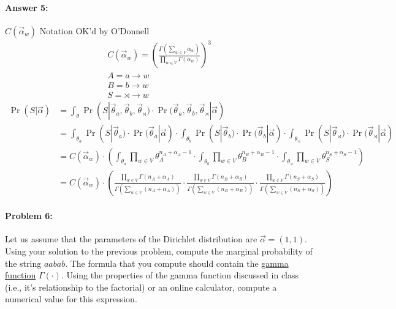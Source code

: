 \documentclass[12pt, letterpaper]{article}
\begin{document}
\paragraph{Answer 5:} $C(\vec{\alpha}_{w})$ Notation OK'd by O'Donnell
\begin{gather*}
    C(\vec{\alpha}_{w}) = \left(\frac{\Gamma(\sum_{w \in V} \alpha_{w})}{\prod_{w \in V} \Gamma(\alpha_{w})}\right)^3\\
    A = a\rightarrow w\\
    B = b \rightarrow w\\
    S = \rtimes \rightarrow w
\end{gather*}
\begin{align*}
    \Pr(S|\vec{\alpha}) &= \int_{\theta} \Pr(S | \vec{\theta}_{a}, \vec{\theta}_{b}, \vec{\theta}_{\rtimes})\cdot{\Pr(\vec{\theta}_{a}}, \vec{\theta}_{b}, \vec{\theta}_{\rtimes}|\vec{\alpha})\\
    &= \int_{\theta_{a}} \Pr(S | \vec{\theta}_{a})\cdot{\Pr(\vec{\theta}_{a}}|\vec{\alpha})\cdot{
    \int_{\theta_{b}} \Pr(S | \vec{\theta}_{b})\cdot{\Pr(\vec{\theta}_{b}}|\vec{\alpha})\cdot{
    \int_{\theta_{\rtimes}} \Pr(S | \vec{\theta}_{\rtimes})\cdot{\Pr(\vec{\theta}_{\rtimes}}|\vec{\alpha})}}\\
    &= C(\vec{\alpha}_{w})\cdot{\left(
    \int_{\theta_{a}}\prod_{w \in V} \theta_{A}^{n_A+\alpha_{A}-1}\cdot{
    \int_{\theta_{b}}\prod_{w \in V} \theta_{B}^{n_B+\alpha_{B}-1}\cdot{
    \int_{\theta_{\rtimes}}\prod_{w \in V} \theta_{S}^{n_S+\alpha_{S}-1}}}\right)}\\
    &= C(\vec{\alpha}_{w})\cdot{\left(
    \frac{\prod_{w \in V} \Gamma(n_A+\alpha_{A})}{\Gamma(\sum_{w\in V} (n_A+\alpha_{A}))}\cdot{
    \frac{\prod_{w \in V} \Gamma(n_B+\alpha_{B})}{\Gamma(\sum_{w \in V} (n_B+\alpha_{B}))}\cdot{
    \frac{\prod_{w \in V} \Gamma(n_S+\alpha_{S})}{\Gamma(\sum_{w \in V} (n_S+\alpha_{S}))}}}\right)}
\end{align*}

\hrulefill
\paragraph{Problem 6:}

Let us assume that the parameters of the Dirichlet distribution are
$\vec{\alpha} = (1,1)$. Using your solution to the previous problem,
compute the marginal probability of the string $aabab$. The formula
that you compute should contain the
\href{https://en.wikipedia.org/wiki/Gamma_function}{gamma function}
$\Gamma(\cdot)$. Using the properties of the gamma function discussed
in class (i.e., it's relationship to the factorial) or an online
calculator, compute a numerical value for this expression.
\end{document}

